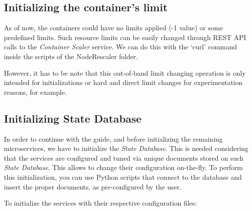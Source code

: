 \documentclass[12pt]{article}
\begin{document}
\subsection{Initializing the container's limit}
As of now, the containers could have no limits applied (-1 value) or some predefined limits. Such resource limits can be easily changed through REST API calls to the \textit{Container Scaler} service. We can do this with the `curl' command inside the scripts of the NodeRescaler folder.\newline

\noindent {} \newline
{} \newline
{} \newline
\newline
\noindent {} \newline
{} \newline
{} \newline

However, it has to be note that this out-of-band limit changing operation is only intended for initializations or hard and direct limit changes for experimentation reasons, for example.


\subsection{Initializing State Database}

In order to continue with the guide, and before initializing the remaining microservices, we have to initialize the \textit{State Database}. This is needed considering that the services are configured and tuned via unique documents stored on such \textit{State Database}. This allows to change their configuration on-the-fly. To perform this initialization, you can use Python scripts that connect to the database and insert the proper documents, as pre-configured by the user.

To initialize the services with their respective configuration files: \newline

\noindent {} \newline
\end{document}
